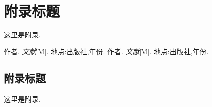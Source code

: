 \documentclass[12pt, a4paper, oneside]{ctexart}
\begin{document}
\section{附录标题}
这里是附录.



\begin{thebibliography}{99}
    作者. \emph{文献}[M]. 地点:出版社,年份.
    作者. \emph{文献}[M]. 地点:出版社,年份.
\end{thebibliography}

\begin{appendices}
    \renewcommand{\thesection}{\Alph{section}}
    \section{附录标题}
    这里是附录.
\end{appendices}
\end{document}
